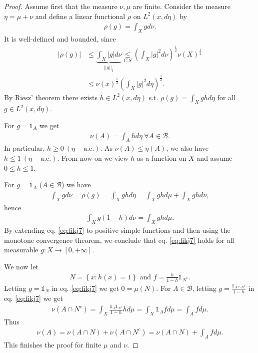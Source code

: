 \begin{proof}
    Assume first that the measure \(\nu,\mu\) are finite. Consider the measure \(\eta = \mu+\nu\) and define a linear functional \(\rho\)
    on \(L^2(x,d\eta)\) by
    \begin{align*}
        \rho(g) = \int_X gd\nu.
    \end{align*}
    It is well-defined and bounded, since 
    \begin{align*}
        |\rho(g)| &\leq \underbrace{\int_X|g|d\nu}_{||g||_1} \underset{C.S}{\leq} (\int_X |g|^2 d\nu)^{\frac{1}{2}} \nu(X)^{\frac{1}{2}} \\
        &\leq \nu(x)^{\frac{1}{2}} (\int_X |g|^2 d\eta)^{\frac{1}{2}}.
    \end{align*}
    By Riesz' theorem there exists \(h\in L^2(x,d\eta)\) s.t. \(\rho(g)=\int_X g h d\eta\) for all \(g\in L^2(x,d\eta)\). 

    For \(g = \mathds{1}_A\) we get
    \begin{align*}
        \nu(A) = \int_A h d\eta \ \forall A\in\mathscr{B}.
    \end{align*}
    In particular, \(h\geq 0 \ (\eta-\text{a.e.})\). As \(\nu(A) \leq \eta(A)\), we also have \(h\leq 1 \ (\eta-\text{a.e.})\). From now on
    we view \(h\) as a function on \(X\) and assume \(0\leq h\leq 1\).

    For \(g=\mathds{1}_A\) (\(A\in\mathscr{B}\)) we have 
    \begin{align*}
        \int_Xg d\nu = \rho(g) = \int_X ghd\eta = \int_X gh d\mu + \int_X ghd\nu,
    \end{align*}
    hence
    \begin{align}   \label{eq:fikj7}
        \int_Xg(1-h)d\nu = \int_X ghd\mu.
    \end{align}
    By extending eq. \ref{eq:fikj7} to positive simple functions and then using the monotone convergence theorem, we conclude that 
    eq. \ref{eq:fikj7} holds for all measurable \(g:X\rightarrow [0,+\infty]\).

    We now let
    \begin{align*}
        N = \left\{ x : h(x) = 1\right\} \text{ and } f = \frac{h}{1 - h}\mathds{1}_{N^c}.
    \end{align*}
    Letting \(g=\mathds{1}_N\) in eq. \ref{eq:fikj7} we get \(0=\mu(N)\). For \(A\in\mathscr{B}\), letting 
    \(g = \frac{\mathds{1}_{A\cap N^c}}{1-h}\) in eq. \ref{eq:fikj7} we get
    \begin{align*}
        \nu\left(A\cap N^c\right) = \int_X \frac{\mathds{1}_A \mathds{1}_{N^c}}{1-h}hd\mu = \int_X \mathds{1}_A fd\mu = \int_A fd\mu.
    \end{align*}
    Thus
    \begin{align*}
        \nu(A) = \nu\left(A\cap N\right) + \nu\left(A\cap N^c\right) = \nu\left(A\cap N\right) + \int_A fd\mu.
    \end{align*}
    This finishes the proof for finite \(\mu\) and \(\nu\).


\end{proof}

